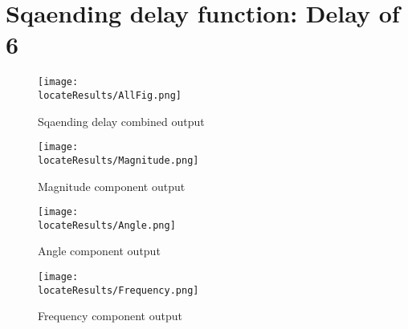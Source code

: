 \newpage
\section{Sqaending delay function: Delay of 6}

\begin{figure}[hb]
    \texttt{[image: \\locateResults/AllFig.png]}    
    \caption{Sqaending delay combined output}
    \label{fig:PMUsim-Sqa6-allfig}
\end{figure}


     \begin{figure}
 
    \texttt{[image: \\locateResults/Magnitude.png]}    
         \label{fig:PMUsim-Sqa6Mag}
        \caption{Magnitude component output}
 
\end{figure}

     \begin{figure}
 
   \texttt{[image: \\locateResults/Angle.png]}    
         \label{fig:PMUsim-Sqa6Ang}
        \caption{Angle component output}
 
\end{figure}

     \begin{figure}
 
   \texttt{[image: \\locateResults/Frequency.png]}    
         \label{fig:PMUsim-Sqa6Freq}
        \caption{Frequency component output}
 
\end{figure}


